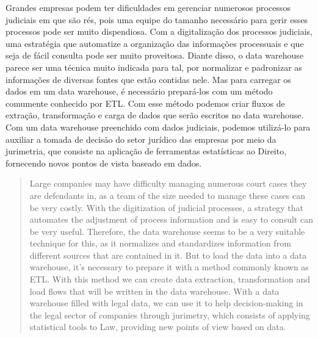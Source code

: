\begin{resumo}
Grandes empresas podem ter dificuldades em gerenciar numerosos processos judiciais em que são rés, pois uma equipe do tamanho necessário para gerir esses processos pode ser muito dispendiosa. Com a digitalização dos processos judiciais, uma estratégia que automatize a organização das informações processuais e que seja de fácil consulta pode ser muito proveitosa. Diante disso, o data warehouse parece ser uma técnica muito indicada para tal, por normalizar e padronizar as informações de diversas fontes que estão contidas nele. Mas para carregar os dados em um data warehouse, é necessário prepará-los com um método comumente conhecido por ETL. Com esse método podemos criar fluxos de extração, transformação e carga de dados que serão escritos no data warehouse. Com um data warehouse preenchido com dados judiciais, podemos utilizá-lo para auxiliar a tomada de decisão do setor jurídico das empresas por meio da jurimetria, que consiste na aplicação de ferramentas estatísticas ao Direito, fornecendo novos pontos de vista baseado em dados.

\end{resumo}

\begin{abstract}
  Large companies may have difficulty managing numerous court cases they are defendants in, as a team of the size needed to manage these cases can be very costly. With the digitization of judicial processes, a strategy that automates the adjustment of process information and is easy to consult can be very useful. Therefore, the data warehouse seems to be a very suitable technique for this, as it normalizes and standardizes information from different sources that are contained in it. But to load the data into a data warehouse, it's necessary to prepare it with a method commonly known as ETL. With this method we can create data extraction, transformation and load flows that will be written in the data warehouse. With a data warehouse filled with legal data, we can use it to help decision-making in the legal sector of companies through jurimetry, which consists of applying statistical tools to Law, providing new points of view based on data.
\end{abstract}